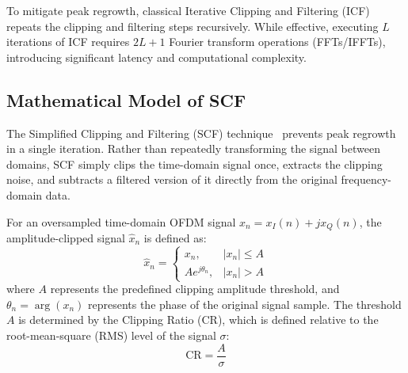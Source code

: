 To mitigate peak regrowth, classical Iterative Clipping and Filtering (ICF) repeats the clipping and filtering steps recursively. While effective, executing $L$ iterations of ICF requires $2L+1$ Fourier transform operations (FFTs/IFFTs), introducing significant latency and computational complexity.

\subsection{Mathematical Model of SCF}

The Simplified Clipping and Filtering (SCF) technique~\cite{wang2005simplified} prevents peak regrowth in a single iteration. Rather than repeatedly transforming the signal between domains, SCF simply clips the time-domain signal once, extracts the clipping noise, and subtracts a filtered version of it directly from the original frequency-domain data.

For an oversampled time-domain OFDM signal $x_n = x_I(n) + j x_Q(n)$, the amplitude-clipped signal $\hat{x}_n$ is defined as:
\begin{equation*}
    \hat{x}_n = \begin{cases}
        x_n,              & |x_n| \le A \\
        A e^{j \theta_n}, & |x_n| > A
    \end{cases}
\end{equation*}
where $A$ represents the predefined clipping amplitude threshold, and $\theta_n = \arg(x_n)$ represents the phase of the original signal sample. The threshold $A$ is determined by the Clipping Ratio (CR), which is defined relative to the root-mean-square (RMS) level of the signal $\sigma$:
\begin{equation*}
    \mathrm{CR} = \frac{A}{\sigma}
\end{equation*}

